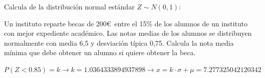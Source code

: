 \documentclass[addpoints,spanish, 12pt,a4paper]{exam}
\begin{document}
\begin{questions}


\question[1] Calcula de la distribución normal estándar $Z \sim N(0, 1)$:

        
\question[2] Un instituto reparte becas de 200\euro  \  entre el 15\% de los alumnos de un instituto con mejor expediente académico. Las notas medias de los alumnos se distribuyen normalmente con media 6,5 y desviación típica 0,75. Calcula la nota media mínima que debe obtener un alumno si quiere obtener la beca.
\begin{solution}
$P(Z<0.85)=k \to k=1.0364333894937898 \to x=k\cdot \sigma + \mu = 7.277325042120342$
\end{solution}


\end{questions}
\end{document}

